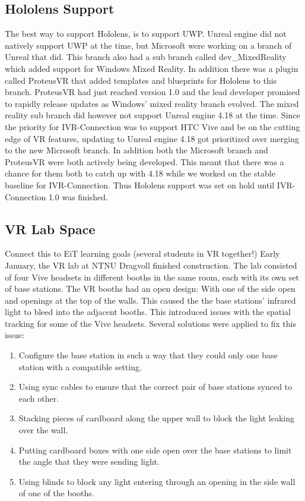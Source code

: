         \subsection{Hololens Support}
        The best way to support Hololens, is to support UWP. Unreal engine did not natively support UWP at the time, but Microsoft were working on a branch of Unreal that did. This branch also had a sub branch called dev\_MixedReality which added support for Windows Mixed Reality. In addition there was a plugin called ProteusVR that added templates and blueprints for Hololens to this branch. ProteusVR had just reached version 1.0 and the lead developer promised to rapidly release updates as Windows' mixed reality branch evolved. The mixed reality sub branch did however not support Unreal engine 4.18 at the time. Since the priority for IVR-Connection was to support HTC Vive and be on the cutting edge of VR features, updating to Unreal engine 4.18 got prioritized over merging to the new Microsoft branch. In addition both the Microsoft branch and ProteusVR were both actively being developed. This meant that there was a chance for them both to catch up with 4.18 while we worked on the stable baseline for IVR-Connection. Thus Hololens support was set on hold until IVR-Connection 1.0 was finished.
        
        \subsection{VR Lab Space}
        
        Connect this to EiT learning goals (several students in VR together!)
        Early January, the VR lab at NTNU Dragvoll finished construction. The lab consisted of four Vive headsets in different booths in the same room, each with its own set of base stations. The VR booths had an open design: With one of the side open and openings at the top of the walls. This caused the the base stations' infrared light to bleed into the adjacent booths. This introduced issues with the spatial tracking for some of the Vive headsets. Several solutions were applied to fix this issue: 
        \begin{enumerate}
            \item Configure the base station in such a way that they could only one base station with a compatible setting.
            \item Using sync cables to ensure that the correct pair of base stations synced to each other.
            \item Stacking pieces of cardboard along the upper wall to block the light leaking over the wall.
            \item Putting cardboard boxes with one side open over the base stations to limit the angle that they were sending light.
            \item Using blinds to block any light entering through an opening in the side wall of one of the booths.
        \end{enumerate}
        
